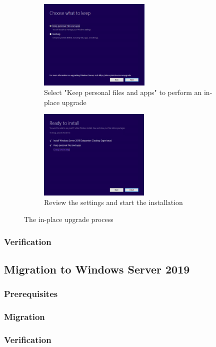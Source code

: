 \begin{figure}[h]\ContinuedFloat
	\begin{subfigure}{0.5\textwidth}
		\captionsetup{width=0.8\linewidth}
		\includegraphics[width=0.9\linewidth,height=4.3cm]{img/In-Place_WS_6.png} 
		\centering
		\caption{Select "Keep personal files and apps" to perform an in-place upgrade}
		\label{fig:inplace6}
	\end{subfigure}
	\begin{subfigure}{0.5\textwidth}
		\captionsetup{width=0.8\linewidth}
		\includegraphics[width=0.9\linewidth,height=4.3cm]{img/In-Place_WS_7.png}
		\centering
		\caption{Review the settings and start the installation}
		\label{fig:inplace7}
	\end{subfigure}
	\caption{The in-place upgrade process}
	\label{fig:inplace}
\end{figure}
\subsubsection{Verification}
\subsection{Migration to Windows Server 2019}
\subsubsection{Prerequisites}
\subsubsection{Migration}
\subsubsection{Verification}
